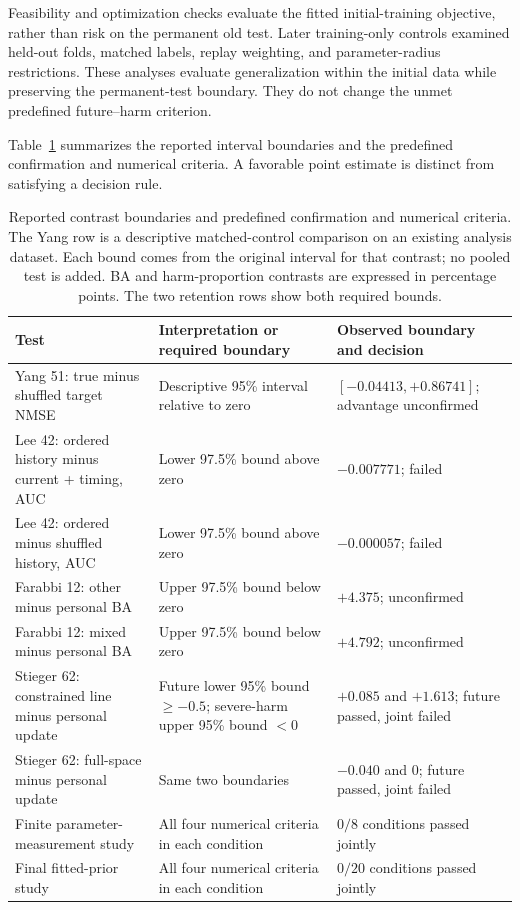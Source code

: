 \documentclass[11pt,a4paper]{article}
\begin{document}
Feasibility and optimization checks evaluate the fitted initial-training objective, rather than risk on the permanent old test. Later training-only controls examined held-out folds, matched labels, replay weighting, and parameter-radius restrictions. These analyses evaluate generalization within the initial data while preserving the permanent-test boundary. They do not change the unmet predefined future--harm criterion.

Table~\ref{tab:decisions} summarizes the reported interval boundaries and the predefined confirmation and numerical criteria. A favorable point estimate is distinct from satisfying a decision rule.

\begin{table}[tbp]
\centering\small
\caption{Reported contrast boundaries and predefined confirmation and numerical criteria. The Yang row is a descriptive matched-control comparison on an existing analysis dataset. Each bound comes from the original interval for that contrast; no pooled test is added. BA and harm-proportion contrasts are expressed in percentage points. The two retention rows show both required bounds.}
\label{tab:decisions}
\begin{tabularx}{\linewidth}{@{}p{.28\linewidth} X p{.25\linewidth}@{}}
\toprule
Test & Interpretation or required boundary & Observed boundary and decision\\
\midrule
Yang 51: true minus shuffled target NMSE & Descriptive 95\% interval relative to zero & $[-0.04413,+0.86741]$; advantage unconfirmed\\
Lee 42: ordered history minus current + timing, AUC & Lower 97.5\% bound above zero & $-0.007771$; failed\\
Lee 42: ordered minus shuffled history, AUC & Lower 97.5\% bound above zero & $-0.000057$; failed\\
Farabbi 12: other minus personal BA & Upper 97.5\% bound below zero & $+4.375$; unconfirmed\\
Farabbi 12: mixed minus personal BA & Upper 97.5\% bound below zero & $+4.792$; unconfirmed\\
Stieger 62: constrained line minus personal update & Future lower 95\% bound $\geq-0.5$; severe-harm upper 95\% bound $<0$ & $+0.085$ and $+1.613$; future passed, joint failed\\
Stieger 62: full-space minus personal update & Same two boundaries & $-0.040$ and $0$; future passed, joint failed\\
Finite parameter-measurement study & All four numerical criteria in each condition & $0/8$ conditions passed jointly\\
Final fitted-prior study & All four numerical criteria in each condition & $0/20$ conditions passed jointly\\
\bottomrule
\end{tabularx}
\end{table}
\end{document}
